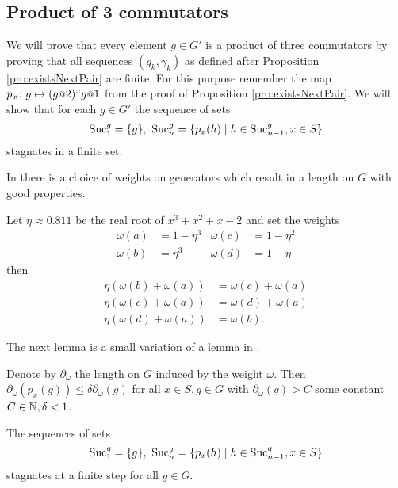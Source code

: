 \documentclass[a4paper,12pt]{article}
\begin{document}
\subsection{Product of 3 commutators}
We will prove that every element $g\in G'$ is a product of three commutators by proving that all
sequences $(g_k,\gamma_k)$ as defined after Proposition \ref{pro:existsNextPair} are finite.
For this purpose remember the map $p_x\colon g \mapsto (g\at{2})^x g\at{1}$ from the proof of Proposition \ref{pro:existsNextPair}.
We will show that for each $g\in G'$ the sequence of sets 
\[\textup{Suc}_1^g=\{g\},\ \textup{Suc}_n^g = \{p_x(h) \mid h\in \textup{Suc}_{n-1}^g, x\in S\} \]
stagnates in a finite set. 

In \cite{Bartholdi:Growth} there is a choice of weights on generators which result in a length on $G$ with good properties.
\begin{lem} \label{lem:laurentsweights}
 Let $\eta\approx 0.811$ be the real root of $x^3+x^2+x-2$ and set the weights 
 \begin{align*}
  \omega(a) &= 1-\eta^3 & \omega(c)&=1-\eta^2 \\ \omega(b)&= \eta^3 & \omega(d)&=1-\eta
 \end{align*}
 then 
 \begin{align*}
  \eta(\omega(b)+\omega(a)) &= \omega(c)+\omega(a) \\
  \eta(\omega(c)+\omega(a)) &= \omega(d)+\omega(a) \\
  \eta(\omega(d)+\omega(a)) &= \omega(b).
 \end{align*}
\end{lem}
The next lemma is a small variation of a lemma in \cite{Bartholdi:Growth}.
\begin{lem}
 Denote by $\partial_\omega$ the length on $G$ induced by the weight $\omega$. Then
 $\partial_\omega(p_x(g)) \leq \delta \partial_\omega(g)$ for all $x\in S, g\in G$ with $\partial_\omega(g)>C$ some constant $C\in\mathbb{N},\delta<1$.
\end{lem}
\begin{cor}
The sequences of sets
 \[\textup{Suc}_1^g=\{g\},\ \textup{Suc}_n^g = \{p_x(h) \mid h\in \textup{Suc}_{n-1}^g, x\in S\} \]
 stagnates at a finite step for all $g\in G$.
\end{cor}
\end{document}
